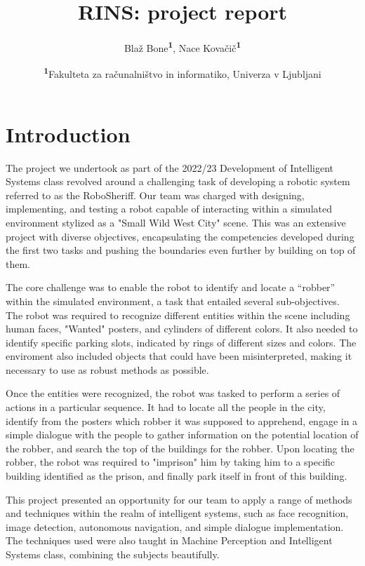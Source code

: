 \documentclass{article}
\begin{document}
\title{RINS: project report}
\author{
	Blaž Bone\textsuperscript{\textbf{1}},
    Nace Kovačič\textsuperscript{\textbf{1}}
 }

\date{\footnotesize\textsuperscript{\textbf{1}}Fakulteta za računalništvo in informatiko, Univerza v Ljubljani}


\maketitle

\section{Introduction}

The project we undertook as part of the 2022/23 Development of Intelligent Systems class revolved around a challenging task of developing a robotic system referred to as the RoboSheriff. Our team was charged with designing, implementing, and testing a robot capable of interacting within a simulated environment stylized as a "Small Wild West City" scene. This was an extensive project with diverse objectives, encapsulating the competencies developed during the first two tasks and pushing the boundaries even further by building on top of them.

The core challenge was to enable the robot to identify and locate a “robber” within the simulated environment, a task that entailed several sub-objectives. The robot was required to recognize different entities within the scene including human faces, "Wanted" posters, and cylinders of different colors. It also needed to identify specific parking slots, indicated by rings of different sizes and colors. The enviroment also included objects that could have been misinterpreted, making it necessary to use as robust methods as possible.

Once the entities were recognized, the robot was tasked to perform a series of actions in a particular sequence. It had to locate all the people in the city, identify from the posters which robber it was supposed to apprehend, engage in a simple dialogue with the people to gather information on the potential location of the robber, and search the top of the buildings for the robber. Upon locating the robber, the robot was required to "imprison" him by taking him to a specific building identified as the prison, and finally park itself in front of this building.

This project presented an opportunity for our team to apply a range of methods and techniques within the realm of intelligent systems, such as face recognition, image detection, autonomous navigation, and simple dialogue implementation. The techniques used were also taught in Machine Perception and Intelligent Systems class, combining the subjects beautifully. 
\end{document}
